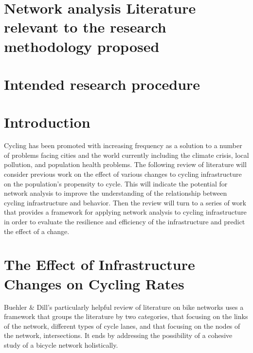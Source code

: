 \documentclass[11pt]{article} %
\begin{document}
\section{Network analysis Literature relevant to the research methodology proposed}

\section{Intended research procedure}

\section{}

\section{}




\section{Introduction}

	Cycling has been promoted with increasing frequency as a solution to a number of problems facing cities and the world currently including the climate crisis, local pollution, and population health problems. The following review of literature will consider previous work on the effect of various changes to cycling infrastructure on the population's propensity to cycle. This will indicate the potential for network analysis to improve the understanding of the relationship between cycling infrastructure and behavior. Then the review will turn to a series of work that provides a framework for applying network analysis to cycling infrastructure in order to evaluate the resilience and efficiency of the infrastructure and predict the effect of a change. 
	
\section{The Effect of Infrastructure Changes on Cycling Rates}

	Buehler \& Dill's \cite{Buehler and Dill} particularly helpful review of literature on bike networks uses a framework that groups the literature by two categories, that focusing on the links of the network, different types of cycle lanes, and that focusing on the nodes of the network, intersections. It ends by addressing the possibility of a cohesive study of a bicycle network holistically. 
	
\end{document}
